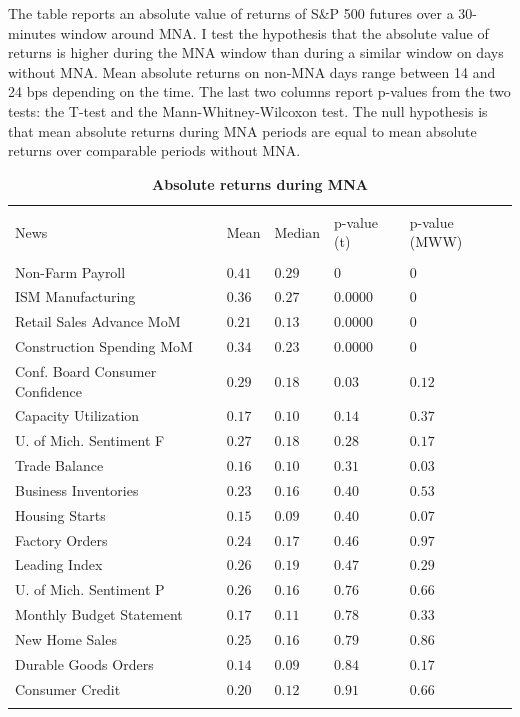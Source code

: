 \documentclass[12pt]{article}
\begin{document}
\begin{table}[!htbp] \centering 
  \caption{\textbf{Absolute returns during MNA}} 
  \label{} 
    \begin{flushleft}
    {\medskip\small
 The table reports an absolute value of returns of S\&P 500 futures over a 30-minutes window around MNA. I test the hypothesis that the absolute value of returns is higher during the MNA window than during a similar window on days without MNA. Mean absolute returns on non-MNA days range between 14 and 24 bps depending on the time. The last two columns report p-values from the two tests: the T-test and the Mann-Whitney-Wilcoxon test. The null hypothesis is that mean absolute returns during MNA periods are equal to mean absolute returns over comparable periods without MNA.}
    \medskip
    \end{flushleft}
\begin{tabular}{@{\extracolsep{5pt}} lllll} 
\\[-1.8ex]\hline 
\hline \\[-1.8ex] 
News & Mean & Median & p-value (t) & p-value (MWW) \\ 
\hline \\[-1.8ex] 
Non-Farm Payroll & $0.41$ & $0.29$ & $0$ & $0$ \\ 
ISM Manufacturing & $0.36$ & $0.27$ & $0.0000$ & $0$ \\ 
Retail Sales Advance MoM & $0.21$ & $0.13$ & $0.0000$ & $0$ \\ 
Construction Spending MoM & $0.34$ & $0.23$ & $0.0000$ & $0$ \\ 
Conf. Board Consumer Confidence & $0.29$ & $0.18$ & $0.03$ & $0.12$ \\ 
Capacity Utilization & $0.17$ & $0.10$ & $0.14$ & $0.37$ \\ 
U. of Mich. Sentiment F & $0.27$ & $0.18$ & $0.28$ & $0.17$ \\ 
Trade Balance & $0.16$ & $0.10$ & $0.31$ & $0.03$ \\ 
Business Inventories & $0.23$ & $0.16$ & $0.40$ & $0.53$ \\ 
Housing Starts & $0.15$ & $0.09$ & $0.40$ & $0.07$ \\ 
Factory Orders & $0.24$ & $0.17$ & $0.46$ & $0.97$ \\ 
Leading Index & $0.26$ & $0.19$ & $0.47$ & $0.29$ \\ 
U. of Mich. Sentiment P & $0.26$ & $0.16$ & $0.76$ & $0.66$ \\ 
Monthly Budget Statement & $0.17$ & $0.11$ & $0.78$ & $0.33$ \\ 
New Home Sales & $0.25$ & $0.16$ & $0.79$ & $0.86$ \\ 
Durable Goods Orders & $0.14$ & $0.09$ & $0.84$ & $0.17$ \\ 
Consumer Credit & $0.20$ & $0.12$ & $0.91$ & $0.66$ \\ 
\hline \\[-1.8ex] 
\end{tabular} 
\end{table}
\end{document}
